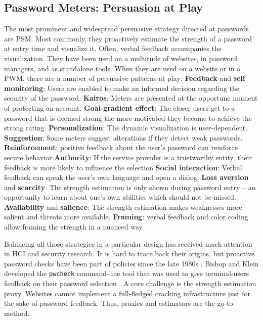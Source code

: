 	\subsection{Password Meters: Persuasion at Play}\label{sec:rw:password-meters}
	The most prominent and widespread persuasive strategy directed at passwords are \gls{PSM}. Most commonly, they  proactively estimate the strength of a password at entry time and visualize it. Often, verbal feedback accompanies the visualization. They have been used on a multitude of websites, in password managers, and as standalone tools. When they are used on a website or in a \gls{PWM}, there are a number of persuasive patterns at play:\newline
	\textbf{Feedback} and \textbf{self monitoring}: Users are enabled to make an informed decision regarding the security of the password.
	\textbf{Kairos}: Meters are presented at the opportune moment of protecting an account.
	\textbf{Goal-gradient effect}: The closer users get to a password that is deemed strong the more motivated they become to achieve the strong rating.
	\textbf{Personalization}: The dynamic visualization is user-dependent.
	\textbf{Suggestion}: Some meters suggest alterations if they detect weak passwords.
	\textbf{Reinforcement}: positive feedback about the user's password can reinforce secure behavior
	\textbf{Authority}: If the service provider is a trustworthy entity, their feedback is more likely to influence the selection 
	\textbf{Social interaction}: Verbal feedback can speak the user's own language and open a dialog. 
	\textbf{Loss aversion} and \textbf{scarcity}: The strength estimation is only shown during password entry -- an opportunity to learn about one's own abilities which should not be missed. 
	\textbf{Availability} and \textbf{salience}: The strength estimation makes weaknesses more salient and threats more available. 
	\textbf{Framing}: verbal feedback and color coding allow framing the strength in a nuanced way.
	
	Balancing all those strategies in a particular design has received much attention in HCI and security research. It is hard to trace back their origins, but proactive password checks have been part of policies since the late 1980s \cite{Wheeler2016zxcvbn}. Bishop and Klein developed the \texttt{pwcheck} command-line tool that was used to give terminal-users feedback on their password selection \cite{Bishop1995ProactivePasswordChecking}. A core challenge is the strength estimation proxy. Websites cannot implement a full-fledged cracking infrastructure just for the sake of password feedback. Thus, proxies and estimators are the go-to method. 
	
